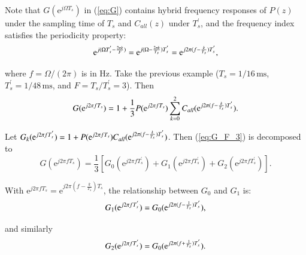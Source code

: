 \documentclass [11pt, proquest] {uwthesis}[2020/02/24]
\begin{document}
Note that $G(\text{e}^{j\Omega T_{s}})$ in (\ref{eq:G}) contains
hybrid frequency responses of $P(z)$ under the sampling time of $T_{s}$
and $C_{all}(z)$ under $T_{s}^{'}$, and the frequency index satisfies
the periodicity property:
\begin{equation}
\text{e}^{j(\Omega T_{s}^{'}-\frac{2\pi k}{F})}=\text{e}^{j(\Omega-\frac{2\pi k}{T_{s}})T_{s}^{'}}=\text{e}^{j2\text{\ensuremath{\pi}}(f-\frac{k}{T_{s}})T_{s}^{'}},\label{eq:G-1}
\end{equation}

\noindent where $f=\Omega/(2\pi)$ is in Hz. Take the previous example
($T_{s}=1/16\,\text{ms}$, $T_{s}^{'}=1/48\,\text{ms}$, and $F=T_{s}/T_{s}^{'}=3$).
Then
\begin{equation}
G(\text{e}^{j2\pi fT_{s}})=1+\frac{1}{3}P(\text{e}^{j2\pi fT_{s}})\sum_{k=0}^{2}C_{all}(\text{e}^{j2\text{\ensuremath{\pi}}(f-\frac{k}{T_{s}})T_{s}^{'}}).\label{eq:G_F_3}
\end{equation}

Let $G_{k}(\text{e}^{j2\pi fT_{s}^{'}})=1+P(\text{e}^{j2\pi fT_{s}})C_{all}(\text{e}^{j2\text{\ensuremath{\pi}}(f-\frac{k}{T_{s}})T_{s}^{'}})$.
Then (\ref{eq:G_F_3}) is decomposed to
\begin{equation}
G(\text{e}^{j2\pi fT_{s}})=\frac{1}{3}\left[G_{0}(\text{e}^{j2\pi fT_{s}^{'}})+G_{1}(\text{e}^{j2\pi fT_{s}^{'}})+G_{2}(\text{e}^{j2\pi fT_{s}^{'}})\right].\label{eq:G_F_3_sim}
\end{equation}

With $\text{e}^{j2\pi fT_{s}}=\text{e}^{j2\pi(f-\frac{k}{T_{s}})T_{s}}$,
the relationship between $G_{0}$ and $G_{1}$ is:
\begin{equation}
G_{1}(\text{e}^{j2\pi fT_{s}^{'}})=G_{0}(\text{e}^{j2\text{\ensuremath{\pi}}(f-\frac{1}{T_{s}})T_{s}^{'}}),\label{eq:G1_G0}
\end{equation}

\noindent and similarly
\begin{equation}
G_{2}(\text{e}^{j2\pi fT_{s}^{'}})=G_{0}(\text{e}^{j2\text{\ensuremath{\pi}}(f+\frac{1}{T_{s}})T_{s}^{'}}).\label{eq:G2_G0}
\end{equation}
\end{document}
